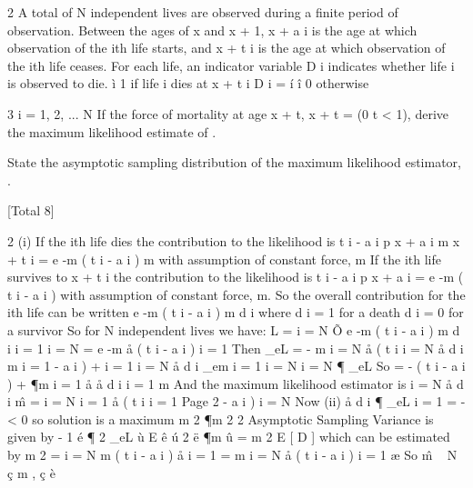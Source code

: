 \documentclass[a4paper,1pt]{article}
\begin{document}
2 A total of N independent lives are observed during a finite period of observation.
Between the ages of x and x + 1, x + a i is the age at which observation of the ith
life starts, and x + t i is the age at which observation of the ith life ceases. For
each life, an indicator variable D i indicates whether life i is observed to die.
ì 1 if life i dies at x + t i
D i = í
î 0 otherwise
\item 
3
i = 1, 2, ... N
If the force of mortality at age x + t, \mu x + t = \mu (0 \leq  t < 1), derive the
maximum likelihood estimate of \mu.

\item  State the asymptotic sampling distribution of the maximum likelihood
estimator, \hat{\mu} .

[Total 8]

2 (i)
If the ith life dies the contribution to the likelihood is
t i - a i
p x + a i m x + t i
= e -m ( t i - a i ) m with assumption of constant force, m
If the ith life survives to x + t i the contribution to the likelihood is
t i - a i
p x + a i = e -m ( t i - a i ) with assumption of constant force, m.
So the overall contribution for the ith life can be written
e -m ( t i - a i ) m d i
where d i = 1 for a death
d i = 0 for a survivor
So for N independent lives we have:
L
=
i = N
Õ e
-m ( t i - a i )
m d i
i = 1
i = N
= e
-m å ( t i - a i )
i = 1
Then \log_{e}L = - m
i = N
å ( t
i
i = N
å d i
m i = 1
- a i ) +
i = 1
i = N
å d
i
\log_{e}m
i = 1
i = N
i = N
¶ \log_{e}L
So
= -
( t i - a i ) +
¶m
i = 1
å
å d
i
i = 1
m
And the maximum likelihood estimator is
i = N
å d
i
m̂ =
i = N
i = 1
å ( t
i
i = 1
Page 2
- a i ) %
i = N
Now
(ii)
å
d i
¶ \log_{e}L
i = 1
= -
< 0 so solution is a maximum
m 2
¶m 2
2
Asymptotic Sampling Variance is given by
-
1
é ¶ 2 \log_{e}L ù
E ê
ú
2
ë ¶m
û
=
m 2
E [ D ]
which can be estimated by
m 2
= i = N
m ( t i - a i )
å
i = 1
=
m
i = N
å ( t
i
- a i )
i = 1
æ
So m̂ ~ N ç m ,
ç
è
\end{document}
